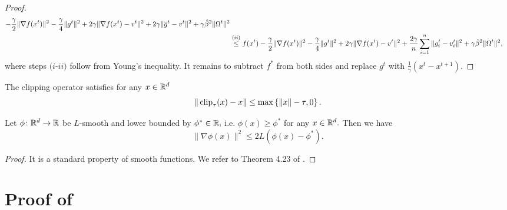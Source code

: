 \documentclass[a4paper,11pt]{article}
\begin{document}
\begin{proof}
\begin{align}
         - \frac{\gamma}{2}\|\nabla f(x^t)\|^2 
         - \frac{\gamma}{4}\|g^t\|^2
         + 2\gamma\|\nabla f(x^t) -v^t\|^2
         + 2\gamma\|\overline{g}^t - v^t\|^2
         + \gamma\hat{\beta}^2\|\Omega^t\|^2\notag\\
         &\overset{(ii)}{\le} f(x^t) 
         - \frac{\gamma}{2}\|\nabla f(x^t)\|^2 
         - \frac{\gamma}{4}\|g^t\|^2
         + 2\gamma\|\nabla f(x^t) -v^t\|^2
         + \frac{2\gamma}{n}\sum_{i=1}^n\|g_i^t - v^t_i\|^2
         + \gamma\hat{\beta}^2\|\Omega^t\|^2,
     \end{align}
     where steps $(i$-$ii)$ follow from Young's inequality. It remains to subtract $f^*$ from both sides and replace $g^t$ with $\frac{1}{\gamma}(x^t - x^{t+1})$.
     
    
\end{proof}




\begin{lemma}\label{lem:clipping_property} The clipping operator satisfies for any $x\in\mathbb{R}^d$
\begin{equation}
    \|\operatorname{clip}_{\tau}(x) - x\|\le \max\left\{\|x\| - \tau, 0\right\}.
\end{equation}
    
\end{lemma}


\begin{lemma}\label{lem:smooth_func} Let $\phi\colon \mathbb{R}^d \to\mathbb{R}$ be $L$-smooth and lower bounded by $\phi^* \in\mathbb{R},$ i.e. $\phi(x) \ge \phi^*$ for any $x\in\mathbb{R}^d.$ Then we have
\begin{equation}
    \|\nabla \phi(x)\|^2 \le 2L(\phi(x) - \phi^*).
\end{equation}
\begin{proof}
    It is a standard property of smooth functions. We refer to Theorem 4.23 of \citep{orabona2019modern}.
\end{proof}
    
\end{lemma}

\section{Proof of }
\end{document}
